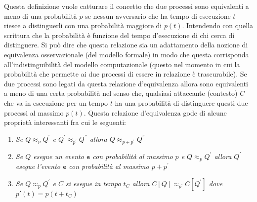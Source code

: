 \documentclass[a4paper,openright,twoside,12pt]{report}
\begin{document}
Questa definizione vuole catturare il concetto che due processi sono equivalenti a meno di una probabilit\`a $p$ se nessun avversario che ha tempo di esecuzione $t$ riesce
a distinguerli con una probabilit\`a maggiore di $p(t)$. Intendendo con quella scrittura che la probabilit\`a \`e funzione del tempo d'esecuzione di chi cerca di distinguere. 
Si pu\`o dire che questa relazione sia un adattamento della nozione di equivalenza osservazionale (del modello formale) in modo che questa corrisponda all'indistinguibilit\`a del modello computazionale 
(questo nel momento in cui la probabilit\`a che permette ai due processi di essere in relazione \`e trascurabile). Se due processi sono legati da questa relazione d'equivalenza allora sono equivalenti a meno di una certa probabilit\`a nel senso che, 
qualsiasi attaccante (contesto) $C$ che va in esecuzione per un tempo $t$ ha una probabilit\`a di distinguere questi due processi al massimo $p(t)$.
Questa relazione d'equivalenza gode di alcune propriet\`a interessanti fra cui le seguenti:
\begin{enumerate}
 \item \emph{Se $Q \approx_p Q^{'}$ e $Q^{'} \approx_{p^{'}} Q^{''}$ allora $Q \approx_{p+p^{'}} Q^{''} $}
 \item \emph{Se $Q$ esegue un evento $\texttt{e}$ con probabilit\`a al massimo $p$ e $Q \approx_p Q^{'}$ allora $Q^{'}$ esegue l'evento $\texttt{e}$ con probabilit\`a al massimo $p+p^{'}$}
 \item \emph{Se $Q \approx_p Q^{'}$ e $C$ si esegue in tempo $t_C$ allora $C[Q] \approx_{p^{'}} C[Q^{'}]$ dove $p'(t)=p(t+t_C)$}
\end{enumerate}
\end{document}

